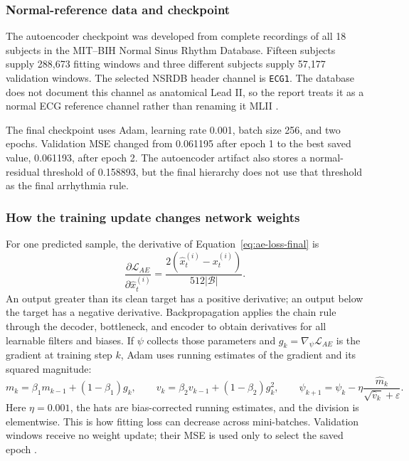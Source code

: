 \subsubsection{Normal-reference data and checkpoint}

The autoencoder checkpoint was developed from complete recordings of all 18
subjects in the MIT--BIH Normal Sinus Rhythm Database. Fifteen subjects supply
288,673 fitting windows and three different subjects supply 57,177 validation
windows. The selected NSRDB header channel is \texttt{ECG1}. The database does
not document this channel as anatomical Lead II, so the report treats it as a
normal ECG reference channel rather than renaming it MLII \cite{nsrdb}.

The final checkpoint uses Adam, learning rate 0.001, batch size 256, and two
epochs. Validation MSE changed from 0.061195 after epoch 1 to the best saved
value, 0.061193, after epoch 2. The autoencoder artifact also stores a
normal-residual threshold of 0.158893, but the final hierarchy does not use
that threshold as the final arrhythmia rule.

\subsubsection{How the training update changes network weights}

For one predicted sample, the derivative of
Equation~\ref{eq:ae-loss-final} is
\begin{equation}
 \frac{\partial\mathcal{L}_{AE}}
 {\partial\widehat x_t^{(i)}}=
 \frac{2(\widehat x_t^{(i)}-x_t^{(i)})}{512|\mathcal{B}|}.
 \label{eq:method-ae-output-gradient}
\end{equation}
An output greater than its clean target has a positive derivative; an output
below the target has a negative derivative. Backpropagation applies the chain
rule through the decoder, bottleneck, and encoder to obtain derivatives for
all learnable filters and biases. If $\psi$ collects those parameters and
$g_k=\nabla_\psi\mathcal{L}_{AE}$ is the gradient at training step $k$, Adam
uses running estimates of the gradient and its squared magnitude:
\begin{equation}
 m_k=\beta_1m_{k-1}+(1-\beta_1)g_k,\qquad
 v_k=\beta_2v_{k-1}+(1-\beta_2)g_k^2,\qquad
 \psi_{k+1}=\psi_k-\eta
 \frac{\widehat m_k}{\sqrt{\widehat v_k}+\varepsilon}.
 \label{eq:method-ae-adam}
\end{equation}
Here $\eta=0.001$, the hats are bias-corrected running estimates, and the
division is elementwise. This is how fitting loss can decrease across
mini-batches. Validation windows receive no weight update; their MSE is used
only to select the saved epoch \cite{kingma2015adam}.

